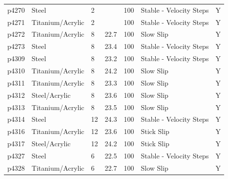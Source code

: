 \documentclass[11pt]{article}
\begin{document}
\begin{center}
\begin{tabular}{ | l l p{1.6cm} p{1.7cm} p{1.6cm} p{4cm} p{0.5cm} | }
p4270      & Steel            & 2                   &                 & 100                   & Stable - Velocity Steps         & Y              \\
p4271      & Titanium/Acrylic & 2                   &                 & 100                   & Stable - Velocity Steps         & Y              \\
p4272      & Titanium/Acrylic & 8                   & 22.7            & 100                   & Slow Slip                       & Y              \\
p4273      & Steel            & 8                   & 23.4            & 100                   & Stable - Velocity Steps         & Y              \\
p4309      & Steel            & 8                   & 23.2            & 100                   & Stable - Velocity Steps         & Y              \\
p4310      & Titanium/Acrylic & 8                   & 24.2            & 100                   & Slow Slip                       & Y              \\
p4311      & Titanium/Acrylic & 8                   & 23.3            & 100                   & Slow Slip                       & Y              \\
p4312      & Steel/Acrylic    & 8                   & 23.6            & 100                   & Slow Slip                       & Y              \\
p4313      & Titanium/Acrylic & 8                   & 23.5            & 100                   & Slow Slip                       & Y              \\
p4314      & Steel            & 12                  & 24.3            & 100                   & Stable - Velocity Steps         & Y              \\
p4316      & Titanium/Acrylic & 12                  & 23.6            & 100                   & Stick Slip                      & Y              \\
p4317      & Steel/Acrylic    & 12                  & 24.2            & 100                   & Stick Slip                      & Y              \\
p4327      & Steel            & 6                   & 22.5            & 100                   & Stable - Velocity Steps         & Y              \\
p4328      & Titanium/Acrylic & 6                   & 22.7            & 100                   & Slow Slip                       & Y              \\

\end{tabular}
\end{center}
\end{document}
